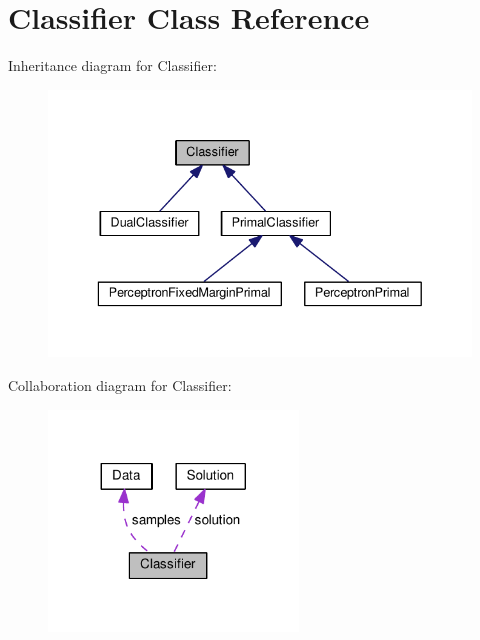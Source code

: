\hypertarget{class_classifier}{}\section{Classifier Class Reference}
\label{class_classifier}


Inheritance diagram for Classifier\+:
\nopagebreak
\begin{figure}[H]
\begin{center}
\leavevmode
\includegraphics[width=336pt]{class_classifier__inherit__graph}
\end{center}
\end{figure}


Collaboration diagram for Classifier\+:
\nopagebreak
\begin{figure}[H]
\begin{center}
\leavevmode
\includegraphics[width=188pt]{class_classifier__coll__graph}
\end{center}
\end{figure}
